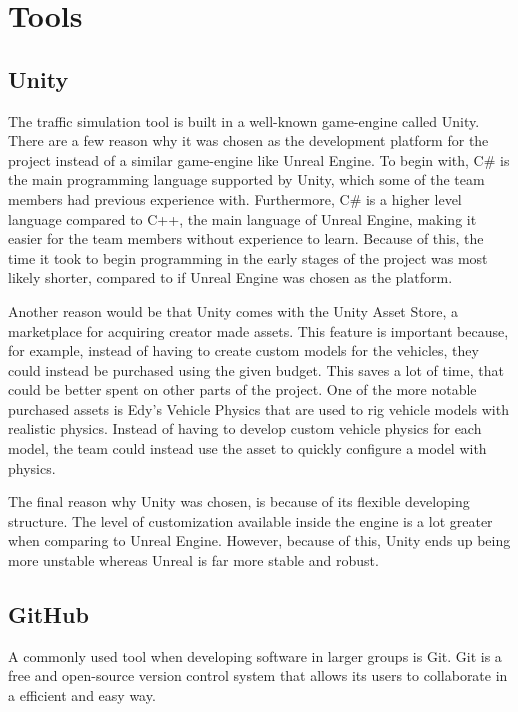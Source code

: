 
\section{Tools}

\subsection{Unity}
    The traffic simulation tool is built in a well-known game-engine called Unity. There are a few reason why it was chosen as the development platform for the project instead of a similar game-engine like Unreal Engine. To begin with, C\# is the main programming language supported by Unity, which some of the team members had previous experience with. Furthermore, C\# is a higher level language compared to C++, the main language of Unreal Engine, making it easier for the team members without experience to learn. Because of this, the time it took to begin programming in the early stages of the project was most likely shorter, compared to if Unreal Engine was chosen as the platform.

    Another reason would be that Unity comes with the Unity Asset Store, a marketplace for acquiring creator made assets. This feature is important because, for example, instead of having to create custom models for the vehicles, they could instead be purchased using the given budget. This saves a lot of time, that could be better spent on other parts of the project. One of the more notable purchased assets is Edy's Vehicle Physics that are used to rig vehicle models with realistic physics. Instead of having to develop custom vehicle physics for each model, the team could instead use the asset to quickly configure a model with physics.

    The final reason why Unity was chosen, is because of its flexible developing structure. The level of customization available inside the engine is a lot greater when comparing to Unreal Engine. However, because of this, Unity ends up being more unstable whereas Unreal is far more stable and robust.

\subsection{GitHub}
    A commonly used tool when developing software in larger groups is Git. Git is a free and open-source version control system that allows its users to collaborate in a efficient and easy way. 

